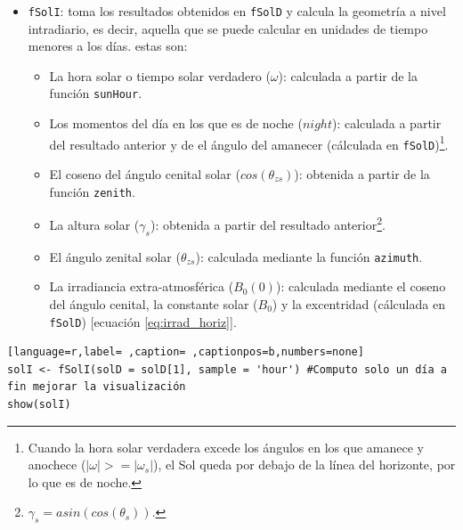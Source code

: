 \begin{itemize}
\item \texttt{fSolI}: toma los resultados obtenidos en \texttt{fSolD} y calcula la geometría a nivel intradiario, es decir, aquella que se puede calcular en unidades de tiempo menores a los días.
estas son:
\begin{itemize}
\item La hora solar o tiempo solar verdadero (\(\omega\)): calculada a partir de la función \texttt{sunHour}.
\item Los momentos del día en los que es de noche (\(night\)): calculada a partir del resultado anterior y de el ángulo del amanecer (cálculada en \texttt{fSolD})\footnote{Cuando la hora solar verdadera excede los ángulos en los que amanece y anochece (\(|\omega|>=|\omega_s|\)), el Sol queda por debajo de la línea del horizonte, por lo que es de noche.}.
\item El coseno del ángulo cenital solar (\(cos(\theta_{zs})\)): obtenida a partir de la función \texttt{zenith}.
\item La altura solar (\(\gamma_s\)): obtenida a partir del resultado anterior\footnote{\(\gamma_s=asin(cos(\theta_s))\).}.
\item El ángulo zenital solar (\(\theta_{zs}\)): calculada mediante la función \texttt{azimuth}.
\item La irradiancia extra-atmosférica (\(B_0(0)\)): calculada mediante el coseno del ángulo cenital, la constante solar (\(B_0\)) y la excentridad (cálculada en \texttt{fSolD}) [ecuación \ref{eq:irrad_horiz}].
\end{itemize}
\end{itemize}
\begin{lstlisting}[language=r,label= ,caption= ,captionpos=b,numbers=none]
solI <- fSolI(solD = solD[1], sample = 'hour') #Computo solo un día a fin mejorar la visualización
show(solI)
\end{lstlisting}

